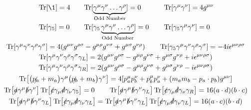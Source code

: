 \begin{gather*}
        \begin{alignedat}{3}
                &\Tr[\1] = 4
                \qquad
                &&\mathrm{Tr}[\underbrace{\gamma^\mu\gamma^\nu\dots\gamma^\rho}_{\mathclap{\text{Odd Number}}}] = 0
                \qquad
                &&\Tr[\gamma^\mu\gamma^\nu] = 4g^{\mu\nu}
                \\
                &\Tr[\gamma_5] = 0
                \qquad
                &&\mathrm{Tr}[\gamma_5\underbrace{\gamma^\mu\gamma^\nu\dots\gamma^\rho}_{\mathclap{\text{Odd Number}}}] = 0
                \qquad
                &&\Tr[\gamma_5\gamma^\mu\gamma^\nu] = 0
        \end{alignedat}
        \\
        \Tr[\gamma^\mu\gamma^\nu\gamma^\rho\gamma^\sigma] = 4\qty(g^{\mu\nu}g^{\rho\sigma} - g^{\mu\rho}g^{\nu\sigma} + g^{\mu\sigma}g^{\nu\rho})
        \qquad
        \Tr[\gamma_5\gamma^\mu\gamma^\nu\gamma^\rho\gamma^\sigma] = -4i\epsilon^{\mu\nu\rho\sigma}
        \\
        \Tr[\gamma^\mu\gamma^\nu\gamma^\rho\gamma^\sigma\gamma_L] = 2\qty(g^{\mu\nu}g^{\rho\sigma} - g^{\mu\rho}g^{\nu\sigma} + g^{\mu\sigma}g^{\nu\rho} + i\epsilon^{\mu\nu\rho\sigma})
        \\
        \Tr[\gamma^\mu\gamma^\nu\gamma^\rho\gamma^\sigma\gamma_R] = 2\qty(g^{\mu\nu}g^{\rho\sigma} - g^{\mu\rho}g^{\nu\sigma} + g^{\mu\sigma}g^{\nu\rho} - i\epsilon^{\mu\nu\rho\sigma})
        \\
        \Tr[\qty(\slashed{p_a}+m_a)\gamma^\mu\qty(\slashed{p_b}+m_b)\gamma^\nu]
        = 4\qty[p_a^{\mu}p_b^{\nu} + p_b^{\mu}p_a^{\nu} + \qty(m_am_b - p_a\cdot p_b)g^{\mu\nu}]
        \\
        \Tr[\slashed{a}\gamma^\mu\slashed{b}\gamma^\nu]\Tr[\slashed{c}\gamma_\mu\slashed{d}\gamma_\nu\gamma_5] = 0
        \qquad
        \Tr[\slashed{a}\gamma^\mu\slashed{b}\gamma^\nu\gamma_L]\Tr[\slashed{c}\gamma_\mu\slashed{d}\gamma_\nu\gamma_R] = 16\qty(a\cdot d)\qty(b\cdot c)
        \\
        \Tr[\slashed{a}\gamma^\mu\slashed{b}\gamma^\nu\gamma_L]\Tr[\slashed{c}\gamma_\mu\slashed{d}\gamma_\nu\gamma_L]
        =
        \Tr[\slashed{a}\gamma^\mu\slashed{b}\gamma^\nu\gamma_L]\Tr[\slashed{c}\gamma_\mu\slashed{d}\gamma_\nu\gamma_L]
        = 16\qty(a\cdot c)\qty(b\cdot d)
\end{gather*}
